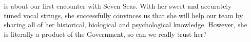  is about our first encounter with Seven Seas. With her sweet and accurately tuned vocal strings, she successfully convinces us that she will help our team by sharing all of her historical, biological and psychological knowledge. However, she is literally a product of the Government, so can we really trust her?

\clearpage
